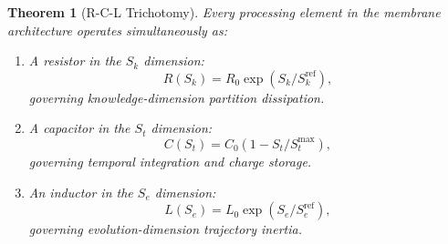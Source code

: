 \documentclass[twocolumn,10pt]{article}
\newtheorem{theorem}{Theorem}[section]
\theoremstyle{remark}
\newcommand{\Sk}{S_k}
\newcommand{\St}{S_t}
\newcommand{\Se}{S_e}
\begin{document}
\begin{theorem}[R-C-L Trichotomy]
\label{thm:rcl}
Every processing element in the membrane architecture operates simultaneously as:
\begin{enumerate}
\item A resistor in the $\Sk$ dimension:
\begin{equation}
R(\Sk) = R_0 \exp(\Sk / \Sk^{\mathrm{ref}}),
\label{eq:resistor}
\end{equation}
governing knowledge-dimension partition dissipation.

\item A capacitor in the $\St$ dimension:
\begin{equation}
C(\St) = C_0 (1 - \St / \St^{\max}),
\label{eq:capacitor}
\end{equation}
governing temporal integration and charge storage.

\item An inductor in the $\Se$ dimension:
\begin{equation}
L(\Se) = L_0 \exp(\Se / \Se^{\mathrm{ref}}),
\label{eq:inductor}
\end{equation}
governing evolution-dimension trajectory inertia.
\end{enumerate}
\end{theorem}
\end{document}
